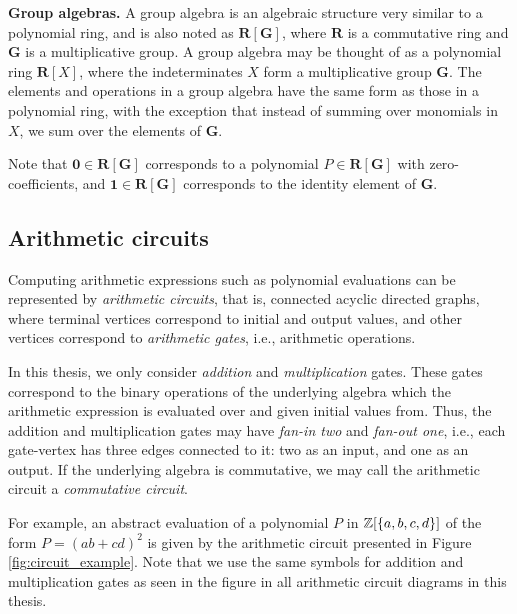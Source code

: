 \textbf{Group algebras.} A group algebra is an algebraic structure 
very similar to a polynomial ring, and 
is also noted as $\mathbf{R}[\mathbf{G}]$, where $\mathbf{R}$ is a commutative ring and 
$\mathbf{G}$ is a multiplicative group. A group algebra may be thought of as a 
polynomial ring $\mathbf{R}[X]$, where the indeterminates $X$ form a multiplicative group $\mathbf{G}$. 
The elements and operations in a group algebra have the same form as those in a polynomial ring, 
with the exception that instead of summing over monomials in $X$, 
we sum over the elements of $\mathbf{G}$.

Note that $\mathbf{0} \in \mathbf{R}[\mathbf{G}]$ corresponds to a 
polynomial $P \in \mathbf{R}[\mathbf{G}]$ with zero-coefficients, and 
$\mathbf{1} \in \mathbf{R}[\mathbf{G}]$ corresponds to the identity element of $\mathbf{G}$. 


\subsection{Arithmetic circuits}
\label{sect:prelims_circuits}

Computing arithmetic expressions such as polynomial evaluations 
can be represented by \emph{arithmetic circuits}, that is, 
connected acyclic directed graphs, where terminal vertices correspond to initial and output values, 
and other vertices correspond to \emph{arithmetic gates}, i.e., arithmetic operations. 

In this thesis, we only consider \emph{addition} and \emph{multiplication} gates. 
These gates correspond to the binary operations of the underlying algebra  
which the arithmetic expression is evaluated over and given initial values from. Thus, 
the addition and multiplication gates may have \emph{fan-in two} and \emph{fan-out one}, 
i.e., each gate-vertex has three edges connected to it: two as an input, and one as an output. 
If the underlying algebra is commutative, we may call the arithmetic circuit a \emph{commutative circuit}. 

For example, an abstract evaluation of a polynomial $P$ in $\mathbb Z[\{a,b,c,d\}]$ of the form 
$P = (ab+cd)^2$ is given by the arithmetic circuit presented in Figure \ref{fig:circuit_example}. 
Note that we use the same symbols for addition and multiplication gates as seen in the figure 
in all arithmetic circuit diagrams in this thesis.

